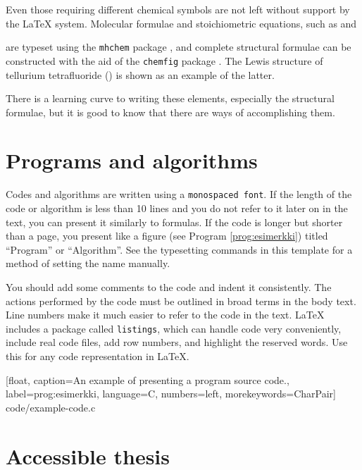 Even those requiring different chemical symbols are not left without support by the \LaTeX{} system. Molecular formulae and stoichiometric equations, such as  and
\begin{center}
\end{center}
are typeset using the \texttt{mhchem} package , and complete structural formulae can be constructed with the aid of the \texttt{chemfig} package . The Lewis structure of tellurium tetrafluoride () is shown as an example of the latter.
\begin{center}
\end{center}
There is a learning curve to writing these elements, especially the structural formulae, but it is good to know that there are ways of accomplishing them.

\section{Programs and algorithms}

Codes and algorithms are written using a \texttt{monospaced font}. If the length of the code or algorithm is less than 10 lines and you do not refer to it later on in the text, you can present it similarly to formulas. If the code is longer but shorter than a page, you present like a figure (see Program \ref{prog:esimerkki}) titled ``Program'' or ``Algorithm''. See the typesetting commands in this template for a method of setting the name manually.

You should add some comments to the code and indent it consistently. The actions performed by the code must be outlined in broad terms in the body text. Line numbers make it much easier to refer to the code in the text. \LaTeX{} includes a package called \texttt{listings}, which can handle code very conveniently, include real code files, add row numbers, and highlight the reserved words. Use this for any code representation in \LaTeX.

\renewcommand{\lstlistingname}{Program}

    [float,
    caption={An example of presenting a program source code.},
    label=prog:esimerkki,
    language=C,
    numbers=left,
    morekeywords={CharPair}]
    {code/example-code.c}

\section{Accessible thesis}

